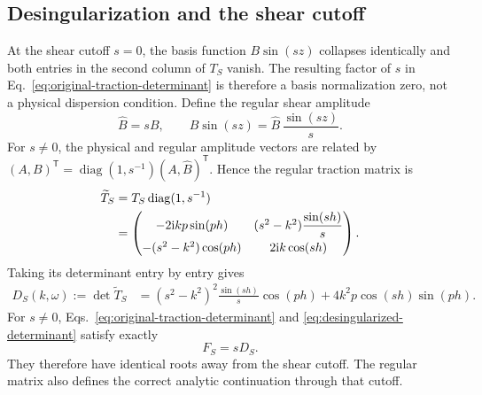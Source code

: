 \subsection{Desingularization and the shear cutoff}

At the shear cutoff \(s=0\), the basis function
\(B\sin(sz)\) collapses identically and both entries in the second column of
\(T_S\) vanish.  The resulting factor of \(s\) in
Eq.~\eqref{eq:original-traction-determinant} is therefore a basis
normalization zero, not a physical dispersion condition.  Define the regular
shear amplitude
\begin{equation}
  \widehat B=sB,
  \qquad
  B\sin(sz)=\widehat B\,\frac{\sin(sz)}{s}.
  \label{eq:regular-shear-amplitude}
\end{equation}
For \(s\neq0\), the physical and regular amplitude vectors are related by
\(
  (A,B)^{\mathsf T}=\operatorname{diag}(1,s^{-1})
  (A,\widehat B)^{\mathsf T}
\).  Hence the regular traction matrix is
\begin{align}
  \widetilde T_S
  &=T_S\operatorname{diag}(1,s^{-1}) \notag\\
  &=\begin{pmatrix}
    -2\mathrm{i}kp\sin(ph)
      &(s^2-k^2)\dfrac{\sin(sh)}{s}\\[6pt]
    -(s^2-k^2)\cos(ph)
      &2\mathrm{i}k\cos(sh)
  \end{pmatrix}.
  \label{eq:regular-traction-matrix}
\end{align}
Taking its determinant entry by entry gives
\begin{align}
  D_S(k,\omega)
  :=\det\widetilde T_S
  &=(s^2-k^2)^2\frac{\sin(sh)}{s}\cos(ph)
    +4k^2p\cos(sh)\sin(ph).
  \label{eq:desingularized-determinant}
\end{align}
For \(s\neq0\), Eqs.~\eqref{eq:original-traction-determinant} and
\eqref{eq:desingularized-determinant} satisfy exactly
\begin{equation}
  F_S=sD_S.
  \label{eq:original-regular-determinant-relation}
\end{equation}
They therefore have identical roots away from the shear cutoff.  The regular
matrix also defines the correct analytic continuation through that cutoff.

